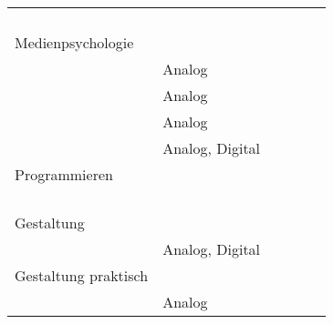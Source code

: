 \begin{table}[]
\begin{tabular}{|l|l|l|l|l|l|}
                            &                 &      &            &      &      \\
                            &                 &      &            &      &      \\
                            &                 &      &            &      &      \\
                            &                 &      &            &      &      \\ \hline
Medienpsychologie           &                 &      &            &      &      \\ \hline
                            & Analog          &      &            &      &      \\
                            & Analog          &      &            &      &      \\
                            & Analog          &      &            &      &      \\
                            & Analog, Digital &      &            &      &      \\ \hline
Programmieren               &                 &      &            &      &      \\ \hline
                            &                 &      &            &      &      \\
                            &                 &      &            &      &      \\
                            &                 &      &            &      &      \\
                            &                 &      &            &      &      \\ \hline
Gestaltung                  &                 &      &            &      &      \\ \hline
                            & Analog, Digital &      &            &      &      \\ \hline
Gestaltung praktisch        &                 &      &            &      &      \\ \hline
                            & Analog          &      &            &      &     
\end{tabular}
\end{table}